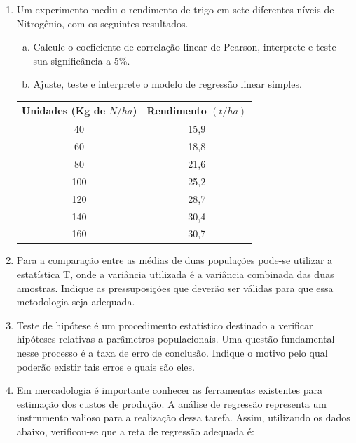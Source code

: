 \documentclass[12pt, a4paper]{article}
\begin{document}
\begin{enumerate}
\begin{enumerate}[a)]
    \item Calcule o coeficiente de correlação linear de Pearson, interprete e teste sua significância a 5\%.
    \item Ajuste, teste e interprete o modelo de regressão linear simples.
\end{enumerate}

\item Um experimento mediu o rendimento de trigo em sete diferentes níveis de Nitrogênio, com os seguintes resultados.
\begin{enumerate}[a)]
    \item Calcule o coeficiente de correlação linear de Pearson, interprete e teste sua significância a 5\%.
    \item Ajuste, teste e interprete o modelo de regressão linear simples.
\end{enumerate}

\begin{center}
\begin{tabular}{|c|c|}
\hline
\textbf{Unidades (Kg de $N/ha$)} & \textbf{Rendimento $(t/ha)$} \\
\hline
40 & 15,9 \\
60 & 18,8 \\
80 & 21,6 \\
100 & 25,2 \\
120 & 28,7 \\
140 & 30,4 \\
160 & 30,7 \\
\hline
\end{tabular}
\end{center}

\item Para a comparação entre as médias de duas populações pode-se utilizar a estatística T, onde a variância utilizada é a variância combinada das duas amostras. Indique as pressuposições que deverão ser válidas para que essa metodologia seja adequada.

\item Teste de hipótese é um procedimento estatístico destinado a verificar hipóteses relativas a parâmetros populacionais. Uma questão fundamental nesse processo é a taxa de erro de conclusão. Indique o motivo pelo qual poderão existir tais erros e quais são eles.

\item Em mercadologia é importante conhecer as ferramentas existentes para estimação dos custos de produção. A análise de regressão representa um instrumento valioso para a realização dessa tarefa. Assim, utilizando os dados abaixo, verificou-se que a reta de regressão adequada é:


\end{enumerate}
\end{document}
